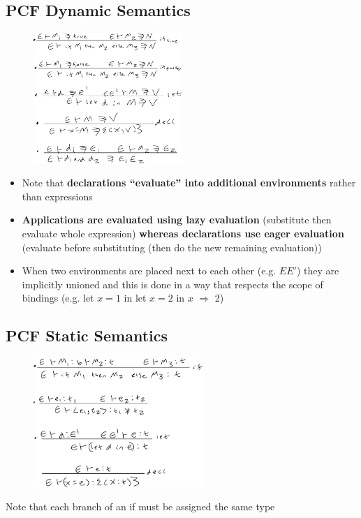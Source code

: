 \documentclass[20pt,a4paper,landscape]{extarticle}
\begin{document}
\begin{flushleft}
\subsection{PCF Dynamic Semantics}
\begin{figure}[h]
\begin{center}
\includegraphics[width=0.5\textwidth]{meta/cs349/PCF_Eval.pdf}{}
\end{center}
\end{figure}
\FloatBarrier
\begin{itemize}
\item Note that \textbf{declarations ``evaluate'' into additional environments} rather than expressions
\item \textbf{Applications are evaluated using lazy evaluation} (substitute then evaluate whole expression) \textbf{whereas declarations use eager evaluation} (evaluate before substituting (then do the new remaining evaluation))
\item When two environments are placed next to each other (e.g. $EE'$) they are implicitly unioned and this is done in a way that respects the scope of bindings (e.g. let $x=1$ in let $x=2$ in $x$ $\Rightarrow$ 2)
\end{itemize}
\clearpage
\subsection{PCF Static Semantics}
\begin{figure}[h]
\begin{center}
\includegraphics[width=0.57\textwidth]{meta/cs349/PCF_Typing.pdf}{}
\end{center}
\end{figure}
\FloatBarrier
Note that each branch of an if must be assigned the same type


\end{flushleft}
\end{document}
